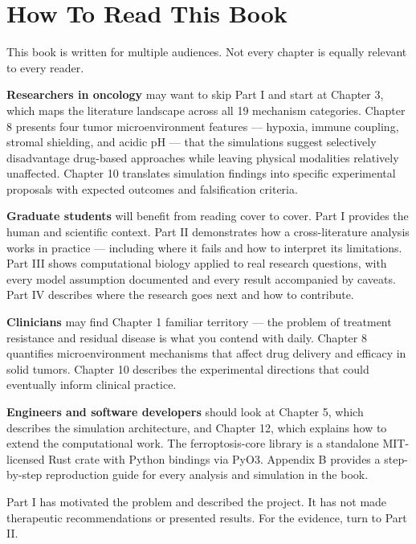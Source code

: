 \documentclass[11pt,twoside,openright]{report}
\begin{document}
\section{How To Read This Book}

This book is written for multiple audiences. Not every chapter is equally relevant to every reader.

\textbf{Researchers in oncology} may want to skip Part I and start at Chapter 3, which maps the literature landscape across all 19 mechanism categories. Chapter 8 presents four tumor microenvironment features --- hypoxia, immune coupling, stromal shielding, and acidic pH --- that the simulations suggest selectively disadvantage drug-based approaches while leaving physical modalities relatively unaffected. Chapter 10 translates simulation findings into specific experimental proposals with expected outcomes and falsification criteria.

\textbf{Graduate students} will benefit from reading cover to cover. Part I provides the human and scientific context. Part II demonstrates how a cross-literature analysis works in practice --- including where it fails and how to interpret its limitations. Part III shows computational biology applied to real research questions, with every model assumption documented and every result accompanied by caveats. Part IV describes where the research goes next and how to contribute.

\textbf{Clinicians} may find Chapter 1 familiar territory --- the problem of treatment resistance and residual disease is what you contend with daily. Chapter 8 quantifies microenvironment mechanisms that affect drug delivery and efficacy in solid tumors. Chapter 10 describes the experimental directions that could eventually inform clinical practice.

\textbf{Engineers and software developers} should look at Chapter 5, which describes the simulation architecture, and Chapter 12, which explains how to extend the computational work. The ferroptosis-core library is a standalone MIT-licensed Rust crate with Python bindings via PyO3. Appendix B provides a step-by-step reproduction guide for every analysis and simulation in the book.

Part I has motivated the problem and described the project. It has not made therapeutic recommendations or presented results. For the evidence, turn to Part II.

\end{document}
